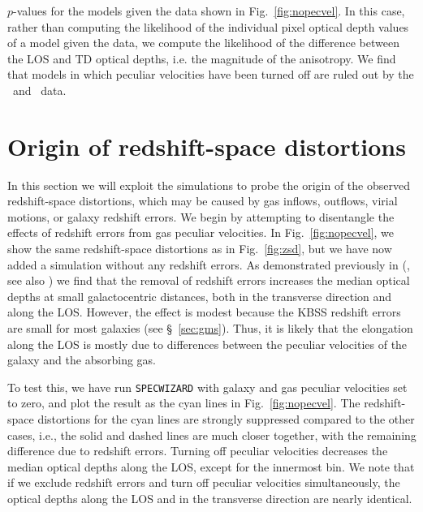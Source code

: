 \documentclass[useAMS,usenatbib,letterpaper]{mn2e}
\begin{document}
 \begin{table*}
 \caption{$p$-values for the models given the data shown in Fig.~\ref{fig:nopecvel}. 
 In this case, rather than computing the likelihood of the individual pixel optical depth 
 values of a model given the data, we compute the likelihood of the difference between 
 the LOS and TD optical depths, i.e. the magnitude of the anisotropy. We find that models
 in which peculiar velocities have been turned off are ruled out by the \hone\ and 
\cfour\ data. 
  }

\label{tab:nopecvel_chisq}
\end{table*}


\section{Origin of redshift-space distortions}
\label{sec:variations}


In this section we will exploit the simulations to probe the origin of the observed redshift-space
distortions, which may be caused by gas inflows, outflows, virial motions, or galaxy redshift errors. 
We begin by attempting to disentangle the effects of redshift errors from gas peculiar velocities. 
In Fig.~\ref{fig:nopecvel}, we show
the same redshift-space distortions as in Fig.~\ref{fig:zsd}, but we
have now added a simulation  without any redshift errors. 
As demonstrated previously in \citeauthor{rakic13} (\citeyear{rakic13}, see also \citealt{tummuangpak14})
we find that the removal of redshift 
errors increases the median optical depths at small galactocentric distances,
both in the transverse direction and along the LOS. However, the effect is modest
because the KBSS redshift errors are small for most galaxies (see \S~\ref{sec:gms}).
Thus, it is likely that the elongation along the LOS is mostly due to differences between
the peculiar velocities of the galaxy and the absorbing gas.

To test this, we have
run \texttt{SPECWIZARD} with galaxy and gas peculiar velocities set to zero, and
plot the result as the cyan lines in Fig.~\ref{fig:nopecvel}. 
The redshift-space distortions for the cyan lines 
are strongly suppressed compared to the other cases, i.e., the solid and dashed
lines are much closer together, with the remaining difference due to redshift errors.
Turning off peculiar velocities
decreases the median optical depths along the LOS, except for the innermost bin. 
We note that if we exclude redshift errors and turn off peculiar velocities 
simultaneously, the optical depths along the LOS and in the transverse direction are 
nearly identical.
\end{document}
